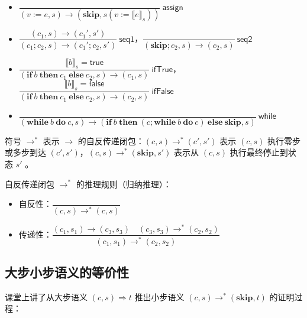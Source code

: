 \documentclass[UTF8]{ctexart}
\begin{document}
    \begin{itemize}
        \setlength{\itemsep}{1em}
        \setlength{\parsep}{1em}
        \item $\dfrac{}{(v:=e,s) \to (\mathbf{skip}, s(v:= {\llbracket e \rrbracket}_s))}\ \mathsf{assign}$
        \item $\dfrac{(c_1, s) \to (c_1', s')}{(c_1; c_2, s) \to (c_1'; c_2, s')}\ \mathsf{seq1}$，$\dfrac{}{(\mathbf{skip}; c_2, s) \to (c_2, s)}\ \mathsf{seq2}$
        \item $\dfrac{{\llbracket b \rrbracket}_s=\mathsf{true}}{(\mathbf{if}\ b\ \mathbf{then}\ c_1\ \mathbf{else}\ c_2, s) \to (c_1, s)}\ \mathsf{ifTrue}$，$\dfrac{{\llbracket b \rrbracket}_s=\mathsf{false}}{(\mathbf{if}\ b\ \mathbf{then}\ c_1\ \mathbf{else}\ c_2, s) \to (c_2, s)}\ \mathsf{ifFalse}$
        \item $\dfrac{}{(\mathbf{while}\ b\ \mathbf{do}\ c, s) \to (\mathbf{if}\ b\ \mathbf{then}\ (c; \mathbf{while}\ b\ \mathbf{do}\ c)\ \mathbf{else}\ \mathbf{skip}, s)}\ \mathsf{while}$
    \end{itemize}
    \setlength{\parskip}{1em}
    符号 $\to^{\ast}$ 表示 $\to$ 的自反传递闭包：$(c, s) \to^{\ast} (c', s')$ 表示 $(c, s)$ 执行零步或多步到达 $(c', s')$，$(c, s) \to^{\ast} (\mathbf{skip}, s')$ 表示从 $(c, s)$ 执行最终停止到状态 $s'$ 。
    \setlength{\parskip}{0em}

    自反传递闭包 $\to^{\ast}$ 的推理规则（归纳推理）：

    \begin{itemize}
        \setlength{\itemsep}{1em}
        \item 自反性：$\dfrac{}{(c, s) \to^{\ast} (c, s)}$
        \item 传递性：$\dfrac{(c_1, s_1) \to (c_3, s_3)\quad (c_3, s_3) \to^{\ast} (c_2, s_2)}{(c_1, s_1) \to^{\ast} (c_2, s_2)}$
    \end{itemize}

    \subsection*{大步小步语义的等价性}

    课堂上讲了从大步语义 $(c, s) \Rightarrow t$ 推出小步语义 $(c, s) \to^{\ast} (\mathbf{skip}, t)$ 的证明过程：
\end{document}
